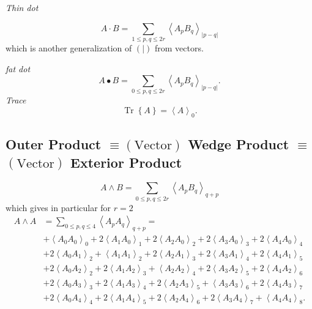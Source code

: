 \documentclass[aps,preprint]{revtex4}%
\begin{document}
\emph{Thin dot}%

\begin{equation}
A\cdot B=\sum_{1\leq p,q\leq2r}\left\langle A_{p}B_{q}\right\rangle
_{\left\vert p-q\right\vert }%
\end{equation}
which is another generalization of $\left(  \left.  {}\right\vert \right)  $
from vectors.

\emph{fat dot}
\begin{equation}
A\bullet B=\sum_{0\leq p,q\leq2r}\left\langle A_{p}B_{q}\right\rangle
_{\left\vert p-q\right\vert }.
\end{equation}
\emph{Trace}%
\begin{equation}
\operatorname*{Tr}\left\{  A\right\}  =\left\langle A\right\rangle _{0}.
\end{equation}


\subsection{Outer Product $\equiv\left(  \text{Vector}\right)  $ Wedge Product
$\equiv$ $\left(  \text{Vector}\right)  $ Exterior Product}%

\begin{equation}
A\wedge B=\sum_{0\leq p,q\leq2r}\left\langle A_{p}B_{q}\right\rangle _{q+p}%
\end{equation}
which gives in particular for $r=2$
\begin{align}
A\wedge A  &  =\sum_{0\leq p,q\leq4}\left\langle A_{p}A_{q}\right\rangle
_{q+p}=\\
&  +\left\langle A_{0}A_{0}\right\rangle _{0}+2\left\langle A_{1}%
A_{0}\right\rangle _{1}+2\left\langle A_{2}A_{0}\right\rangle _{2}%
+2\left\langle A_{3}A_{0}\right\rangle _{3}+2\left\langle A_{4}A_{0}%
\right\rangle _{4}\\
&  +2\left\langle A_{0}A_{1}\right\rangle _{2}+\left\langle A_{1}%
A_{1}\right\rangle _{2}+2\left\langle A_{2}A_{1}\right\rangle _{3}%
+2\left\langle A_{3}A_{1}\right\rangle _{4}+2\left\langle A_{4}A_{1}%
\right\rangle _{5}\\
&  +2\left\langle A_{0}A_{2}\right\rangle _{2}+2\left\langle A_{1}%
A_{2}\right\rangle _{3}+\left\langle A_{2}A_{2}\right\rangle _{4}%
+2\left\langle A_{3}A_{2}\right\rangle _{5}+2\left\langle A_{4}A_{2}%
\right\rangle _{6}\\
&  +2\left\langle A_{0}A_{3}\right\rangle _{3}+2\left\langle A_{1}%
A_{3}\right\rangle _{4}+2\left\langle A_{2}A_{3}\right\rangle _{5}%
+\left\langle A_{3}A_{3}\right\rangle _{6}+2\left\langle A_{4}A_{3}%
\right\rangle _{7}\\
&  +2\left\langle A_{0}A_{4}\right\rangle _{4}+2\left\langle A_{1}%
A_{4}\right\rangle _{5}+2\left\langle A_{2}A_{4}\right\rangle _{6}%
+2\left\langle A_{3}A_{4}\right\rangle _{7}+\left\langle A_{4}A_{4}%
\right\rangle _{8}.
\end{align}
\end{document}
